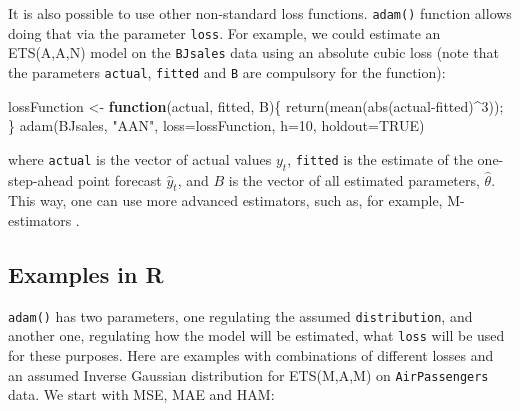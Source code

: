\documentclass[
]{book}
\newenvironment{Shaded}{\begin{snugshade}}{\end{snugshade}}
\newcommand{\AttributeTok}[1]{\textcolor[rgb]{0.77,0.63,0.00}{#1}}
\newcommand{\ConstantTok}[1]{\textcolor[rgb]{0.00,0.00,0.00}{#1}}
\newcommand{\ControlFlowTok}[1]{\textcolor[rgb]{0.13,0.29,0.53}{\textbf{#1}}}
\newcommand{\DecValTok}[1]{\textcolor[rgb]{0.00,0.00,0.81}{#1}}
\newcommand{\FunctionTok}[1]{\textcolor[rgb]{0.00,0.00,0.00}{#1}}
\newcommand{\NormalTok}[1]{#1}
\newcommand{\OtherTok}[1]{\textcolor[rgb]{0.56,0.35,0.01}{#1}}
\newcommand{\SpecialCharTok}[1]{\textcolor[rgb]{0.00,0.00,0.00}{#1}}
\newcommand{\StringTok}[1]{\textcolor[rgb]{0.31,0.60,0.02}{#1}}
\theoremstyle{definition}
\theoremstyle{definition}
\theoremstyle{definition}
\theoremstyle{definition}
\theoremstyle{remark}
\begin{document}
It is also possible to use other non-standard loss functions. \texttt{adam()} function allows doing that via the parameter \texttt{loss}. For example, we could estimate an ETS(A,A,N) model on the \texttt{BJsales} data using an absolute cubic loss (note that the parameters \texttt{actual}, \texttt{fitted} and \texttt{B} are compulsory for the function):

\begin{Shaded}
\begin{Highlighting}[]
\NormalTok{lossFunction }\OtherTok{\textless{}{-}} \ControlFlowTok{function}\NormalTok{(actual, fitted, B)\{}
    \FunctionTok{return}\NormalTok{(}\FunctionTok{mean}\NormalTok{(}\FunctionTok{abs}\NormalTok{(actual}\SpecialCharTok{{-}}\NormalTok{fitted)}\SpecialCharTok{\^{}}\DecValTok{3}\NormalTok{));}
\NormalTok{\}}
\FunctionTok{adam}\NormalTok{(BJsales, }\StringTok{"AAN"}\NormalTok{, }\AttributeTok{loss=}\NormalTok{lossFunction, }\AttributeTok{h=}\DecValTok{10}\NormalTok{, }\AttributeTok{holdout=}\ConstantTok{TRUE}\NormalTok{)}
\end{Highlighting}
\end{Shaded}

where \texttt{actual} is the vector of actual values \(y_t\), \texttt{fitted} is the estimate of the one-step-ahead point forecast \(\hat{y}_t\), and \(B\) is the vector of all estimated parameters, \(\hat{\theta}\). This way, one can use more advanced estimators, such as, for example, M-estimators \citep{Barrow2020}.

\hypertarget{examples-in-r}{%
\subsection{Examples in R}\label{examples-in-r}}

\texttt{adam()} has two parameters, one regulating the assumed \texttt{distribution}, and another one, regulating how the model will be estimated, what \texttt{loss} will be used for these purposes. Here are examples with combinations of different losses and an assumed Inverse Gaussian distribution for ETS(M,A,M) on \texttt{AirPassengers} data. We start with MSE, MAE and HAM:
\end{document}
